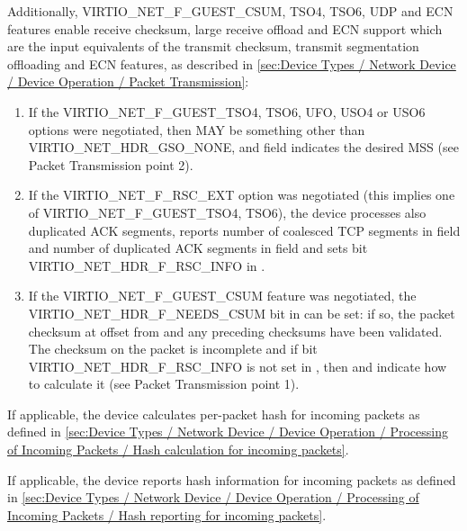 Additionally, VIRTIO_NET_F_GUEST_CSUM, TSO4, TSO6, UDP and ECN
features enable receive checksum, large receive offload and ECN
support which are the input equivalents of the transmit checksum,
transmit segmentation offloading and ECN features, as described
in \ref{sec:Device Types / Network Device / Device Operation /
Packet Transmission}:
\begin{enumerate}
\item If the VIRTIO_NET_F_GUEST_TSO4, TSO6, UFO, USO4 or USO6 options were
  negotiated, then  MAY be something other than
  VIRTIO_NET_HDR_GSO_NONE, and  field indicates the
  desired MSS (see Packet Transmission point 2).
\item If the VIRTIO_NET_F_RSC_EXT option was negotiated (this
  implies one of VIRTIO_NET_F_GUEST_TSO4, TSO6), the
  device processes also duplicated ACK segments, reports
  number of coalesced TCP segments in  field and
  number of duplicated ACK segments in  field
  and sets bit VIRTIO_NET_HDR_F_RSC_INFO in .
\item If the VIRTIO_NET_F_GUEST_CSUM feature was negotiated, the
  VIRTIO_NET_HDR_F_NEEDS_CSUM bit in  can be
  set: if so, the packet checksum at offset 
  from  and any preceding checksums
  have been validated.  The checksum on the packet is incomplete and
  if bit VIRTIO_NET_HDR_F_RSC_INFO is not set in ,
  then  and  indicate how to calculate it
  (see Packet Transmission point 1).

\end{enumerate}

If applicable, the device calculates per-packet hash for incoming packets as
defined in \ref{sec:Device Types / Network Device / Device Operation / Processing of Incoming Packets / Hash calculation for incoming packets}.

If applicable, the device reports hash information for incoming packets as
defined in \ref{sec:Device Types / Network Device / Device Operation / Processing of Incoming Packets / Hash reporting for incoming packets}.

\label{devicenormative:Device Types / Network Device / Device Operation / Processing of Packets}%

